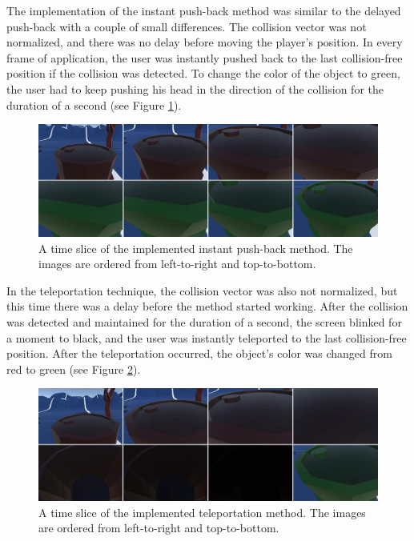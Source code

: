 The implementation of the instant push-back method was similar to the delayed push-back with a couple of small differences. The collision vector was not normalized, and there was no delay before moving the player's position. In every frame of application, the user was instantly pushed back to the last collision-free position if the collision was detected. To change the color of the object to green, the user had to keep pushing his head in the direction of the collision for the duration of a second (see Figure \ref{fig:instantimplementation}). 

\begin{figure}[th]
\centering
\includegraphics[width=1\textwidth]{img/instant_implementation.jpg}
\caption{A time slice of the implemented instant push-back method. The images are ordered from left-to-right and top-to-bottom.}
\label{fig:instantimplementation}
\end{figure}

In the teleportation technique, the collision vector was also not normalized, but this time there was a delay before the method started working. After the collision was detected and maintained for the duration of a second, the screen blinked for a moment to black, and the user was instantly teleported to the last collision-free position. After the teleportation occurred, the object's color was changed from red to green (see Figure \ref{fig:teleportimplementation}).

\begin{figure}[th]
\centering
\includegraphics[width=1\textwidth]{img/teleport_implementation.jpg}
\caption{A time slice of the implemented teleportation method. The images are ordered from left-to-right and top-to-bottom.}
\label{fig:teleportimplementation}
\end{figure}

